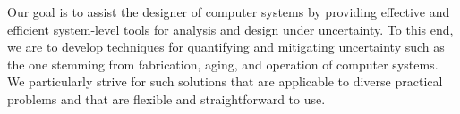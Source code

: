 Our goal is to assist the designer of computer systems by providing effective
and efficient system-level tools for analysis and design under uncertainty. To
this end, we are to develop techniques for quantifying and mitigating
uncertainty such as the one stemming from fabrication, aging, and operation of
computer systems. We particularly strive for such solutions that are applicable
to diverse practical problems and that are flexible and straightforward to use.
